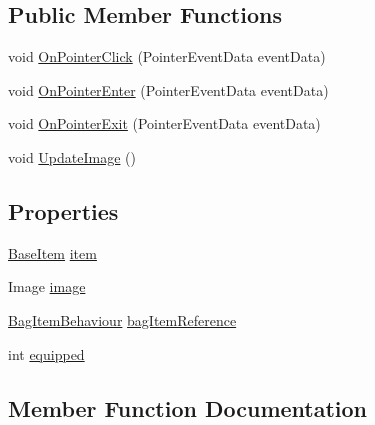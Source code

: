 \subsection*{Public Member Functions}
\begin{DoxyCompactItemize}
\item 
void \mbox{\hyperlink{class_bag_item_behaviour_a81455fb5bdcd5a14ca9440c0f9581708}{On\+Pointer\+Click}} (Pointer\+Event\+Data event\+Data)
\item 
void \mbox{\hyperlink{class_bag_item_behaviour_a9dd6c0fb07dd87363f0198070a16cff7}{On\+Pointer\+Enter}} (Pointer\+Event\+Data event\+Data)
\item 
void \mbox{\hyperlink{class_bag_item_behaviour_a94a401c7a518b7ed17e5648153d6f1b6}{On\+Pointer\+Exit}} (Pointer\+Event\+Data event\+Data)
\item 
void \mbox{\hyperlink{class_bag_item_behaviour_aaedcc49f5d2def63dcde17d72fdb3b9d}{Update\+Image}} ()
\end{DoxyCompactItemize}
\subsection*{Properties}
\begin{DoxyCompactItemize}
\item 
\mbox{\hyperlink{class_base_item}{Base\+Item}} \mbox{\hyperlink{class_bag_item_behaviour_aae12bd30d28c11b793bd8db232e9c2a2}{item}}
\item 
Image \mbox{\hyperlink{class_bag_item_behaviour_a10d2d4e2b468574fb4f922da7f300cbc}{image}}
\item 
\mbox{\hyperlink{class_bag_item_behaviour}{Bag\+Item\+Behaviour}} \mbox{\hyperlink{class_bag_item_behaviour_a804cf27502bc5bb77a2fa80e178903db}{bag\+Item\+Reference}}
\item 
int \mbox{\hyperlink{class_bag_item_behaviour_a7772dc51a9cde63e29f6a683f8fbb451}{equipped}}
\end{DoxyCompactItemize}


\subsection{Member Function Documentation}
\mbox{\label{class_bag_item_behaviour_a81455fb5bdcd5a14ca9440c0f9581708}} 
